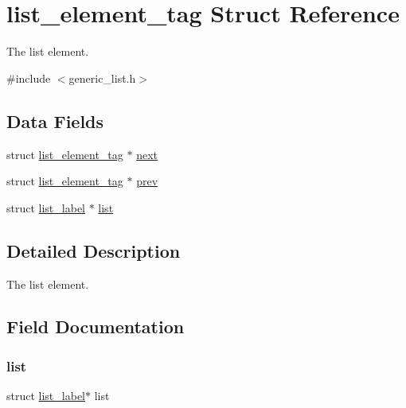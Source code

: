 \hypertarget{structlist__element__tag}{}\section{list\+\_\+element\+\_\+tag Struct Reference}
\label{structlist__element__tag}


The list element.  




{\ttfamily \#include $<$generic\+\_\+list.\+h$>$}

\subsection*{Data Fields}
\begin{DoxyCompactItemize}
\item 
struct \mbox{\hyperlink{structlist__element__tag}{list\+\_\+element\+\_\+tag}} $\ast$ \mbox{\hyperlink{structlist__element__tag_a4620116f3b0b7da92291c039d1966b23}{next}}
\item 
struct \mbox{\hyperlink{structlist__element__tag}{list\+\_\+element\+\_\+tag}} $\ast$ \mbox{\hyperlink{structlist__element__tag_aadec3baa530680d7890f627cf882aa6d}{prev}}
\item 
struct \mbox{\hyperlink{structlist__label}{list\+\_\+label}} $\ast$ \mbox{\hyperlink{structlist__element__tag_a4518e37bfd235ea400a228923351e362}{list}}
\end{DoxyCompactItemize}


\subsection{Detailed Description}
The list element. 

\subsection{Field Documentation}
\mbox{\label{structlist__element__tag_a4518e37bfd235ea400a228923351e362}} 
\subsubsection{\texorpdfstring{list}{list}}
{\footnotesize\ttfamily struct \mbox{\hyperlink{structlist__label}{list\+\_\+label}}$\ast$ list}

